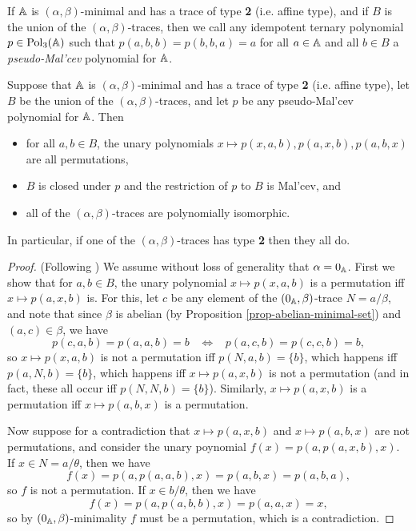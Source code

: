 \begin{appendices}
\begin{defn} If $\mathbb{A}$ is $(\alpha,\beta)$-minimal and has a trace of type \textbf{2} (i.e. affine type), and if $B$ is the union of the $(\alpha,\beta)$-traces, then we call any idempotent ternary polynomial $p \in \operatorname{Pol}_3(\mathbb{A})$ such that $p(a,b,b) = p(b,b,a) = a$ for all $a \in \mathbb{A}$ and all $b \in B$ a \emph{pseudo-Mal'cev} polynomial for $\mathbb{A}$.
\end{defn}


\begin{thm} Suppose that $\mathbb{A}$ is $(\alpha,\beta)$-minimal and has a trace of type \textbf{2} (i.e. affine type), let $B$ be the union of the $(\alpha,\beta)$-traces, and let $p$ be any pseudo-Mal'cev polynomial for $\mathbb{A}$. Then
\begin{itemize}
\item for all $a,b \in B$, the unary polynomials $x \mapsto p(x,a,b), p(a,x,b), p(a,b,x)$ are all permutations,
\item $B$ is closed under $p$ and the restriction of $p$ to $B$ is Mal'cev, and
\item all of the $(\alpha,\beta)$-traces are polynomially isomorphic.
\end{itemize}
In particular, if one of the $(\alpha,\beta)$-traces has type \textbf{2} then they all do.
\end{thm}
\begin{proof} (Following \cite{hobby-mckenzie}) We assume without loss of generality that $\alpha = 0_{\mathbb{A}}$. First we show that for $a,b \in B$, the unary polynomial $x \mapsto p(x,a,b)$ is a permutation iff $x \mapsto p(a,x,b)$ is. For this, let $c$ be any element of the $(0_{\mathbb{A}},\beta)$-trace $N = a/\beta$, and note that since $\beta$ is abelian (by Proposition \ref{prop-abelian-minimal-set}) and $(a,c) \in \beta$, we have
\[
p(c,a,b) = p(a,a,b) = b \;\;\; \iff \;\;\; p(a,c,b) = p(c,c,b) = b,
\]
so $x \mapsto p(x,a,b)$ is not a permutation iff $p(N,a,b) = \{b\}$, which happens iff $p(a,N,b) = \{b\}$, which happens iff $x \mapsto p(a,x,b)$ is not a permutation (and in fact, these all occur iff $p(N,N,b) = \{b\}$). Similarly, $x \mapsto p(a,x,b)$ is a permutation iff $x \mapsto p(a,b,x)$ is a permutation.

Now suppose for a contradiction that $x \mapsto p(a,x,b)$ and $x \mapsto p(a,b,x)$ are not permutations, and consider the unary poynomial $f(x) = p(a,p(a,x,b),x)$. If $x \in N = a/\theta$, then we have
\[
f(x) = p(a,p(a,a,b),x) = p(a,b,x) = p(a,b,a),
\]
so $f$ is not a permutation. If $x \in b/\theta$, then we have
\[
f(x) = p(a,p(a,b,b),x) = p(a,a,x) = x,
\]
so by $(0_{\mathbb{A}},\beta)$-minimality $f$ must be a permutation, which is a contradiction.


\end{proof}
\end{appendices}
